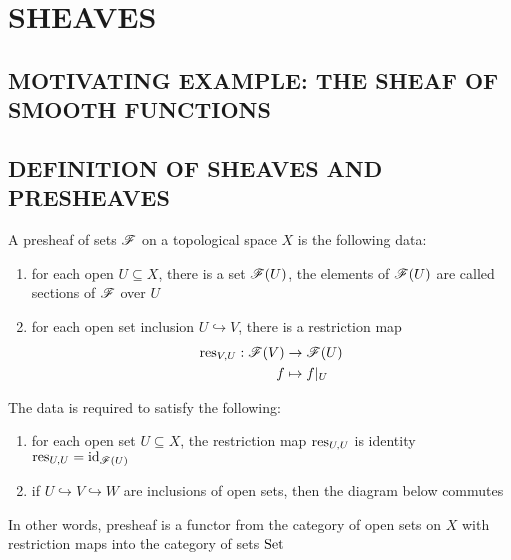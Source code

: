 \section{SHEAVES}

\subsection{MOTIVATING EXAMPLE: THE SHEAF OF SMOOTH FUNCTIONS}


\subsection{DEFINITION OF SHEAVES AND PRESHEAVES}

\begin{definition}
	A presheaf of sets $\mathscr{F}$ on a topological space $X$ is the following data:
	\begin{enumerate}
		\item for each open $U \subseteq X$, there is a set $\mathscr{F}(U)$, the elements of $\mathscr{F}(U)$ are called sections of $\mathscr{F}$ over $U$
		
		\item for each open set inclusion $U \hookrightarrow V$, there is a restriction map
		\begin{align*}
			\operatorname{res}_{V, U}: \mathscr{F}(V) &\to \mathscr{F}(U) \\
											   f &\mapsto f\vert_U
		\end{align*}
	\end{enumerate}
	
	The data is required to satisfy the following:
	\begin{enumerate}
		\item for each open set $U \subseteq X$, the restriction map $\operatorname{res}_{U, U}$ is identity $\operatorname{res}_{U, U} = \operatorname{id}_{\mathscr{F}(U)}$
		\item if $U \hookrightarrow V \hookrightarrow W$ are inclusions of open sets, then the diagram below commutes
		\begin{center}
		\end{center}
	\end{enumerate}
	
	In other words, presheaf is a functor from the category of open sets on $X$ with restriction maps into the category of sets $\operatorname{Set}$
\end{definition}

